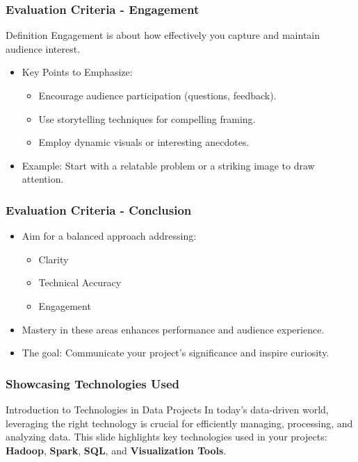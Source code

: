 \documentclass{beamer}
\begin{document}
\begin{frame}[fragile]
    \frametitle{Evaluation Criteria - Engagement}
    \begin{block}{Definition}
        Engagement is about how effectively you capture and maintain audience interest.
    \end{block}
    \begin{itemize}
        \item Key Points to Emphasize:
        \begin{itemize}
            \item Encourage audience participation (questions, feedback).
            \item Use storytelling techniques for compelling framing.
            \item Employ dynamic visuals or interesting anecdotes.
        \end{itemize}
        \item Example: Start with a relatable problem or a striking image to draw attention.
    \end{itemize}
\end{frame}

\begin{frame}[fragile]
    \frametitle{Evaluation Criteria - Conclusion}
    \begin{itemize}
        \item Aim for a balanced approach addressing:
        \begin{itemize}
            \item Clarity
            \item Technical Accuracy
            \item Engagement
        \end{itemize}
        \item Mastery in these areas enhances performance and audience experience.
        \item The goal: Communicate your project's significance and inspire curiosity.
    \end{itemize}
\end{frame}

\begin{frame}[fragile]
    \frametitle{Showcasing Technologies Used}
    \begin{block}{Introduction to Technologies in Data Projects}
        In today's data-driven world, leveraging the right technology is crucial for efficiently managing, processing, and analyzing data. 
        This slide highlights key technologies used in your projects: 
        \textbf{Hadoop}, \textbf{Spark}, \textbf{SQL}, and \textbf{Visualization Tools}.
    \end{block}
\end{frame}
\end{document}
